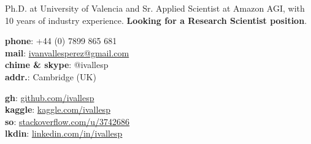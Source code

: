 \documentclass{resume} %
\begin{document}
\noindent

\printname
\vspace{5pt}

\begin{minipage}[t]{.345\textwidth}
	\raggedright


Ph.D. at University of Valencia and Sr. Applied Scientist at Amazon AGI, with  10 years of industry experience.
\textbf{Looking for a Research Scientist position}.

\end{minipage}\hspace{.05\textwidth}
\begin{minipage}[t]{.29\textwidth}
	\raggedright
	{\textbf{phone}: +44 (0) 7899 865 681 \\
	\textbf{mail}: \href{mailto:ivanvallesperez@gmail.com}{ivanvallesperez@gmail.com}\\
	\textbf{chime \& skype}: @ivallesp \\
	\textbf{addr.}: Cambridge (UK)
}
\end{minipage}\hspace{.03\textwidth}
\begin{minipage}[t]{.29\textwidth}
	\raggedright
	{ \textbf{gh}: \href{https://www.github.com/ivallesp}{github.com/ivallesp}  \\
	  \textbf{kaggle}: \href{https://www.kaggle.com/ivallesp}{kaggle.com/ivallesp}  \\
	  \textbf{so}: \href{https://stackoverflow.com/users/3742686/ivallesp}{stackoverflow.com/u/3742686} \\
	  \textbf{lkdin}: \href{https://www.linkedin.com/in/ivallesp}{linkedin.com/in/ivallesp}
	}
\end{minipage}


\vspace{5pt}
\end{document}
